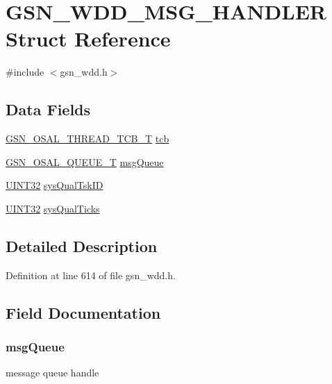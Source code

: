 \hypertarget{a00279}{
\section{GSN\_\-WDD\_\-MSG\_\-HANDLER Struct Reference}
\label{a00279}
}


{\ttfamily \#include $<$gsn\_\-wdd.h$>$}

\subsection*{Data Fields}
\begin{DoxyCompactItemize}
\item 
\hyperlink{a00628_ga43c1eefe78fa26e478301976f96ac31f}{GSN\_\-OSAL\_\-THREAD\_\-TCB\_\-T} \hyperlink{a00279_afe071d7dcf0fdfb6314fefc4b6f663df}{tcb}
\item 
\hyperlink{a00628_gaebe1c924d01bf6607bd65961bf134095}{GSN\_\-OSAL\_\-QUEUE\_\-T} \hyperlink{a00279_a3525baeed8d9f795ed0c44437f548da2}{msgQueue}
\item 
\hyperlink{a00660_gae1e6edbbc26d6fbc71a90190d0266018}{UINT32} \hyperlink{a00279_a3e06cb8fa58f49b7004a85c6f387ddc7}{sysQualTskID}
\item 
\hyperlink{a00660_gae1e6edbbc26d6fbc71a90190d0266018}{UINT32} \hyperlink{a00279_a3b8eb219c70a5f7fc6dcb9d9643cbc31}{sysQualTicks}
\end{DoxyCompactItemize}


\subsection{Detailed Description}


Definition at line 614 of file gsn\_\-wdd.h.



\subsection{Field Documentation}
\hypertarget{a00279_a3525baeed8d9f795ed0c44437f548da2}{
\subsubsection[{msgQueue}]{ {\bf msgQueue}}}
\label{a00279_a3525baeed8d9f795ed0c44437f548da2}
message queue handle 

